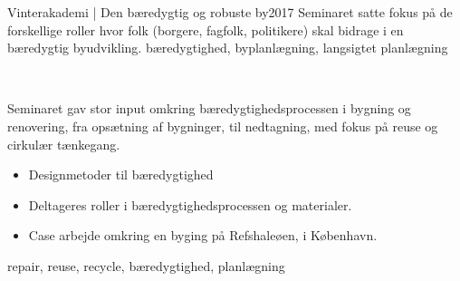 \begin{projects}
\project
{Vinterakademi | Den bæredygtig og robuste by}{2017}
{}
{Seminaret satte fokus på de forskellige roller hvor folk (borgere, fagfolk, politikere) skal bidrage i en bæredygtig byudvikling.}
{bæredygtighed, byplanlægning, langsigtet planlægning}


	{ \\  }
	{ Seminaret gav stor input omkring bæredygtighedsprocessen i bygning og renovering, fra opsætning af bygninger, til nedtagning, med fokus på reuse og cirkulær tænkegang.
 \begin{itemize}
    	\item Designmetoder til bæredygtighed
        \item Deltageres roller i bæredygtighedsprocessen og materialer.
        \item Case arbejde omkring en byging på Refshaleøen, i København.
        \end{itemize}
        }
	{repair, reuse, recycle, bæredygtighed, planlægning}


\end{projects}